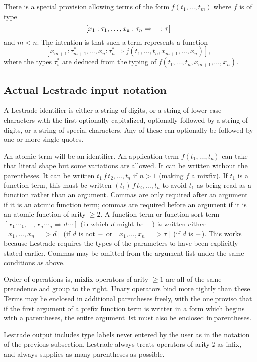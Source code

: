 \documentclass[12pt]{article}
\begin{document}
There is a special provision allowing terms of the form $f(t_1,\ldots,t_m)$ where $f$ is of type $$[x_1:\tau_1,\ldots,x_n:\tau_n \Rightarrow {\tt -}:\tau]$$ and $m<n$.  The intention is that such a term represents a function
$$[x_{m+1}:\tau^*_{m+1},\ldots,x_n:\tau^*_n \Rightarrow f(t_1,\ldots,t_n,x_{m+1},\ldots,x_n)],$$ where the types
$\tau^*_i$ are deduced from the typing of $f(t_1,\ldots,t_n,x_{m+1},\ldots,x_n)$.

\subsection{Actual Lestrade input notation}

A Lestrade identifier is either a string of digits, or a string of lower case characters with the first optionally capitalized, optionally followed by a string of digits, or a string of special characters.  Any of these can optionally be followed by one or more single quotes.

An atomic term will be an identifier.  An application term $f(t_1,\ldots,t_n)$ can take that literal shape but some variations are allowed.  It can be written without the parentheses.  It can be written $t_1\, f \,t_2,\ldots,t_n$ if $n>1$ (making $f$ a mixfix).  If $t_1$ is a function term, this must be written
$(t_1) \,f \,t_2,\ldots,t_n$ to avoid $t_1$ as being read as a function rather than an argument.  Commas are only required
after an argument if it is an atomic function term;  commas are required before an argument if it is an atomic function of arity $\geq 2$.  A function term or function sort term $[x_1:\tau_1,\ldots,x_n:\tau_n \Rightarrow d:\tau]$ (in which $d$ might be ${\tt -}$) is written either $[x_1,\ldots,x_n=>d]$ (if $d$ is not ${\tt -}$ or $[x_1,\ldots,x_n=>\tau]$ (if $d$ is ${\tt -}$).  This works because Lestrade requires the types of the parameters to have been explicitly stated earlier.  Commas may be omitted from the argument list under the same conditions as above.

Order of operations is, mixfix operators of arity $\geq 1$ are all of the same precedence and group to the right.
Unary operators bind more tightly than these.  Terms may be enclosed in additional parentheses freely, with the one proviso that if the first argument of a prefix function term is written in a form which begins with a parentheses, the entire argument list must
also be enclosed in parentheses.
 
Lestrade output includes type labels never entered by the user as in the notation of the previous subsection.
Lestrade always treats operators of arity 2 as infix, and always supplies as many parentheses as possible.
\end{document}
